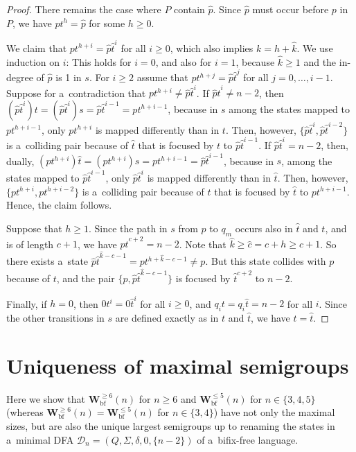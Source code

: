 \documentclass{amsart}
\renewcommand{\le}{\leqslant}
\renewcommand{\ge}{\geqslant}
\newcommand{\Vbf}{\mathbf{W}^{\le 5}_{\mathrm{bf}}}
\newcommand{\Wbf}{\mathbf{W}^{\ge 6}_{\mathrm{bf}}}
\newcommand{\e}[1]{\hat{#1}}
\newcommand{\cD}{{\mathcal D}}
\begin{document}
\begin{proof}
There remains the case where $P$ contain $\e{p}$.
Since $\e{p}$ must occur before $p$ in $P$, we have $p t^h = \e{p}$ for some $h \ge 0$.

We claim that $p t^{h+i} = \e{p} \e{t}^{i}$ for all $i \ge 0$, which also implies $k = h+\e{k}$.
We use induction on $i$:
This holds for $i = 0$, and also for $i=1$, because $\e{k} \ge 1$ and the in-degree of $\e{p}$ is 1 in $s$.
For $i \ge 2$ assume that $p t^{h+j} = \e{p} \e{t}^{j}$ for all $j = 0,\ldots,i-1$.
Suppose for a~contradiction that $p t^{h+i} \neq \e{p} \e{t}^i$.
If $\e{p} \e{t}^i \neq n-2$, then $(\e{p} \e{t}^i)t = (\e{p} \e{t}^i)s = \e{p} \e{t}^{i-1} = p t^{h+i-1}$,
because in $s$ among the states mapped to $p t^{h+i-1}$, only $p t^{h+i}$ is mapped differently than in $t$.
Then, however, $\{\e{p} \e{t}^i,\e{p} \e{t}^{i-2}\}$ is a~colliding pair because of $\e{t}$ that is focused by $t$ to $\e{p} \e{t}^{i-1}$.
If $\e{p} \e{t}^i = n-2$, then, dually, $(p t^{h+i}) \e{t} = (p t^{h+i}) s = p t^{h+i-1} = \e{p} \e{t}^{i-1}$,
because in $s$, among the states mapped to $\e{p} \e{t}^{i-1}$, only $\e{p} \e{t}^i$ is mapped differently than in $\e{t}$.
Then, however, $\{p t^{h+i},p t^{h+i-2}\}$ is a~colliding pair because of $t$ that is focused by $\e{t}$ to $p t^{h+i-1}$.
Hence, the claim follows.

Suppose that $h \ge 1$.
Since the path in $s$ from $p$ to $q_m$ occurs also in $\e{t}$ and $t$, and is of length $c+1$, we have $p \e{t}^{c+2} = n-2$.
Note that $\e{k} \ge \e{c} = c+h \ge c+1$.
So there exists a~state $\e{p} \e{t}^{\e{k}-c-1} = p t^{h+\e{k}-c-1} \neq p$.
But this state collides with $p$ because of $t$, and the pair $\{p,\e{p} \e{t}^{\e{k}-c-1}\}$ is focused by $\e{t}^{c+2}$ to $n-2$.

Finally, if $h = 0$, then $0 t^i = 0 \e{t}^i$ for all $i \ge 0$, and $q_i t = q_i \e{t} = n-2$ for all $i$.
Since the other transitions in $s$ are defined exactly as in $t$ and $\e{t}$, we have $t = \e{t}$.
\end{proof}

\section{Uniqueness of maximal semigroups}

Here we show that $\Wbf(n)$ for $n \ge 6$ and $\Vbf(n)$ for $n \in \{3,4,5\}$ (whereas $\Wbf(n)=\Vbf(n)$ for $n \in \{3,4\}$) have not only the maximal sizes, but are also the unique largest semigroups up to renaming the states in a~minimal DFA $\cD_n = (Q,\Sigma,\delta,0,\{n-2\})$ of a~bifix-free language.
\end{document}
